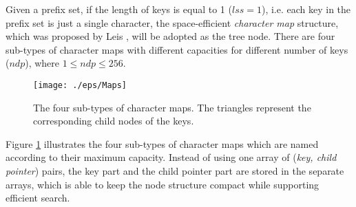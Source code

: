 \documentclass{article}
\begin{document}
Given a prefix set, if the length of keys is equal to 1 ($lss=1$),
i.e. each key in the prefix set is just a single character, the
space-efficient \emph{character map} structure, which was proposed by
Leis \cite{Leis2013}, will be adopted as the tree node. There are four
sub-types of character maps with different capacities for different
number of keys ($ndp$), where $1 \leq ndp \leq 256$.

\begin{figure}[htbp]
  \centering
  \texttt{[image: ./eps/Maps]}
  \caption{The four sub-types of character maps. The triangles
    represent the corresponding child nodes of the keys.}
  \label{fig:character map}
\end{figure}

Figure \ref{fig:character map} illustrates the four sub-types of
character maps which are named according to their maximum
capacity. Instead of using one array of (\emph{key, child pointer})
pairs, the key part and the child pointer part are stored in the
separate arrays, which is able to keep the node structure compact
while supporting efficient search.
\end{document}
